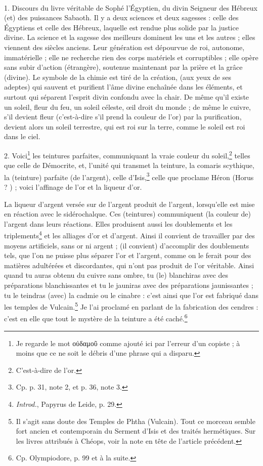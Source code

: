 \documentclass[landscape, a4paper, 11pt, oneside, polutonikogreek, french]{article}
\begin{document}
\paragraph{}
1. Discours du livre véritable de Sophé l'Égyptien, du divin Seigneur des Hébreux (et) des puissances Sabaoth. Il y a deux sciences et deux sagesses : celle des Égyptiens et celle des Hébreux, laquelle est rendue plus solide par la justice divine. La science et la sagesse des meilleurs dominent les uns et les autres ; elles viennent des siècles anciens. Leur génération est dépourvue de roi, autonome, immatérielle ; elle ne recherche rien des corps matériels et corruptibles ; elle opère sans subir d'action (étrangère), soutenue maintenant par la prière et la grâce (divine). Le symbole de la chimie est tiré de la création, (aux yeux de ses adeptes) qui sauvent et purifient l'âme divine enchaînée dans les éléments, et surtout qui séparent l'esprit divin confondu avec la chair. De même qu'il existe un soleil, fleur du feu, un soleil céleste, œil droit du monde ; de même le cuivre, s'il devient fleur (c'est-à-dire s'il prend la couleur de l'or) par la purification, devient alors un soleil terrestre, qui est roi sur la terre, comme le soleil est roi dans le ciel.

2. Voici\footnote{Je regarde le mot οὐδαμοῦ comme ajouté ici par l'erreur d'un copiste ; à moins que ce ne soit le débris d'une phrase qui a disparu.} les teintures parfaites, communiquant la vraie couleur du soleil,\footnote{C'est-à-dire de l'or.} telles que celle de Démocrite, et, l'unité qui transmet la teinture, la comaris scythique, la (teinture) parfaite (de l'argent), celle d'Isis,\footnote{Cp. p. 31, note 2, et p. 36, note 3.} celle que proclame Héron (Horus ? ) ; voici l'affinage de l'or et la liqueur d'or.

La liqueur d'argent versée sur de l'argent produit de l'argent, lorsqu'elle est mise en réaction avec le sidérochalque. Ces (teintures) communiquent (la couleur de) l'argent dans leurs réactions. Elles produisent aussi les doublements et les triplements\footnote{\emph{Introd.}, Papyrus de Leide, p. 29.} et les alliages d'or et d'argent. Ainsi il convient de travailler par des moyens artificiels, sans or ni argent ; (il convient) d'accomplir des doublements tels, que l'on ne puisse plus séparer l'or et l'argent, comme on le ferait pour des matières adultérées et discordantes, qui n'ont pas produit de l'or véritable. Ainsi quand tu auras obtenu du cuivre sans ombre, tu (le) blanchiras avec des préparations blanchissantes et tu le jauniras avec des préparations jaunissantes ; tu le teindras (avec) la cadmie ou le cinabre : c'est ainsi que l'or est fabriqué dans les temples de Vulcain.\footnote{Il s'agit sans doute des Temples de Phtha (Vulcain). Tout ce morceau semble fort ancien et contemporain du Serment d'Isis et des traités hermétiques. Sur les livres attribués à Chéops, voir la note en tête de l'article précédent.} Je l'ai proclamé en parlant de la fabrication des cendres : c'est en elle que tout le mystère de la teinture a été caché.\footnote{Cp. Olympiodore, p. 99 et à la suite.}
\end{document}
